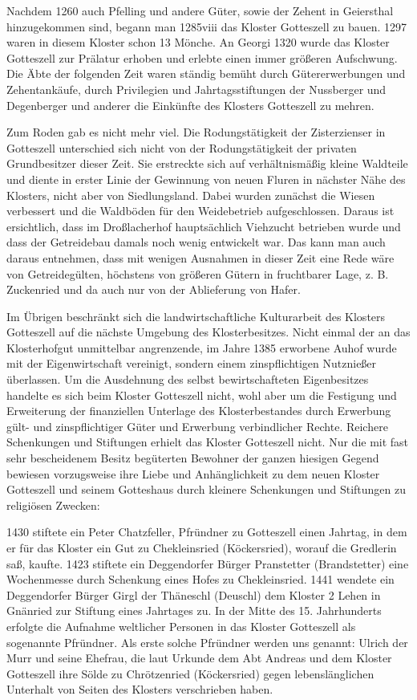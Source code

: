 \documentclass{book}
\begin{document}
Nachdem 1260 auch Pfelling und andere Güter, sowie der Zehent in Geiersthal
hinzugekommen sind, begann man 1285viii das Kloster Gotteszell zu bauen. 1297
waren in diesem Kloster schon 13 Mönche. An Georgi 1320 wurde das Kloster
Gotteszell zur Prälatur erhoben und erlebte einen immer größeren Aufschwung. Die
Äbte der folgenden Zeit waren ständig bemüht durch Gütererwerbungen und
Zehentankäufe, durch Privilegien und Jahrtagsstiftungen der Nussberger und
Degenberger und anderer die Einkünfte des Klosters Gotteszell zu mehren.

Zum Roden gab es nicht mehr viel. Die Rodungstätigkeit der Zisterzienser in
Gotteszell unterschied sich nicht von der Rodungstätigkeit der privaten
Grundbesitzer dieser Zeit. Sie erstreckte sich auf verhältnismäßig kleine
Waldteile und diente in erster Linie der Gewinnung von neuen Fluren in nächster
Nähe des Klosters, nicht aber von Siedlungsland. Dabei wurden zunächst die
Wiesen verbessert und die Waldböden für den Weidebetrieb aufgeschlossen. Daraus
ist ersichtlich, dass im Droßlacherhof hauptsächlich Viehzucht betrieben wurde
und dass der Getreidebau damals noch wenig entwickelt war. Das kann man auch
daraus entnehmen, dass mit wenigen Ausnahmen in dieser Zeit eine Rede wäre von
Getreidegülten, höchstens von größeren Gütern in fruchtbarer Lage, z. B.
Zuckenried und da auch nur von der Ablieferung von Hafer.

Im Übrigen beschränkt sich die landwirtschaftliche Kulturarbeit des Klosters
Gotteszell auf die nächste Umgebung des Klosterbesitzes. Nicht einmal der an das
Klosterhofgut unmittelbar angrenzende, im Jahre 1385 erworbene Auhof wurde mit
der Eigenwirtschaft vereinigt, sondern einem zinspflichtigen Nutznießer
überlassen. Um die Ausdehnung des selbst bewirtschafteten Eigenbesitzes handelte
es sich beim Kloster Gotteszell nicht, wohl aber um die Festigung und
Erweiterung der finanziellen Unterlage des Klosterbestandes durch Erwerbung
gült- und zinspflichtiger Güter und Erwerbung verbindlicher Rechte. Reichere
Schenkungen und Stiftungen erhielt das Kloster Gotteszell nicht. Nur die mit
fast sehr bescheidenem Besitz begüterten Bewohner der ganzen hiesigen Gegend
bewiesen vorzugsweise ihre Liebe und Anhänglichkeit zu dem neuen Kloster
Gotteszell und seinem Gotteshaus durch kleinere Schenkungen und Stiftungen zu
religiösen Zwecken:

1430 stiftete ein Peter Chatzfeller, Pfründner zu Gotteszell einen Jahrtag, in
dem er für das Kloster ein Gut zu Chekleinsried (Köckersried), worauf die
Gredlerin saß, kaufte. 1423 stiftete ein Deggendorfer Bürger Pranstetter
(Brandstetter) eine Wochenmesse durch Schenkung eines Hofes zu Chekleinsried.
1441 wendete ein Deggendorfer Bürger Girgl der Thäneschl (Deuschl) dem Kloster 2
Lehen in Gnänried zur Stiftung eines Jahrtages zu. In der Mitte des 15.
Jahrhunderts erfolgte die Aufnahme weltlicher Personen in das Kloster Gotteszell
als sogenannte Pfründner. Als erste solche Pfründner werden uns genannt: Ulrich
der Murr und seine Ehefrau, die laut Urkunde dem Abt Andreas und dem Kloster
Gotteszell ihre Sölde zu Chrötzenried (Köckersried) gegen lebenslänglichen
Unterhalt von Seiten des Klosters verschrieben haben.
\end{document}
